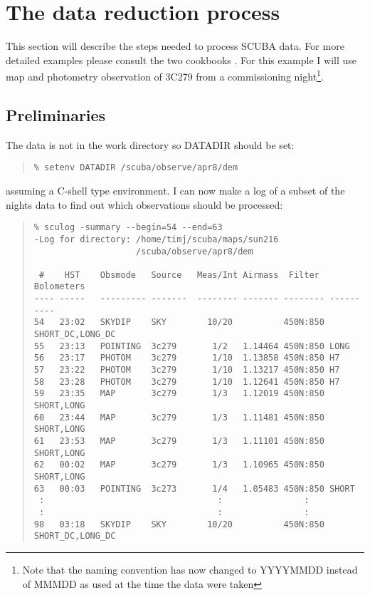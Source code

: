 \documentclass[twoside,11pt]{article}
\newenvironment{myquote}{\begin{quote}\begin{small}}{\end{small}\end{quote}}
\newcommand{\xlabel}[1]{}
\begin{document}
\section{\xlabel{reduction}The data reduction process\label{reduction}}

This section will describe the steps needed to process SCUBA data. For more
detailed examples please consult the two cookbooks \cite{S97,SANDELL97}.
For this example I will use map and photometry observation of 3C279
from a commissioning night\footnote{Note that the naming convention has now
changed to YYYYMMDD instead of MMMDD as used at the time the data were
taken}.

\subsection{Preliminaries}
\label{prelim}

The data is not in the work directory so DATADIR should be set:

\begin{myquote}
\begin{verbatim}
% setenv DATADIR /scuba/observe/apr8/dem
\end{verbatim}
\end{myquote}

assuming a C-shell type environment. I can now make a log of a subset
of the nights data to find out which observations should be processed:

\begin{myquote}
\begin{verbatim}
% sculog -summary --begin=54 --end=63
-Log for directory: /home/timj/scuba/maps/sun216
                    /scuba/observe/apr8/dem
 
 #    HST    Obsmode   Source   Meas/Int Airmass  Filter  Bolometers
---- -----   --------- -------  -------- ------- -------- ----------
54   23:02   SKYDIP    SKY        10/20          450N:850 SHORT_DC,LONG_DC
55   23:13   POINTING  3c279       1/2   1.14464 450N:850 LONG
56   23:17   PHOTOM    3c279       1/10  1.13858 450N:850 H7
57   23:22   PHOTOM    3c279       1/10  1.13217 450N:850 H7
58   23:28   PHOTOM    3c279       1/10  1.12641 450N:850 H7
59   23:35   MAP       3c279       1/3   1.12019 450N:850 SHORT,LONG
60   23:44   MAP       3c279       1/3   1.11481 450N:850 SHORT,LONG
61   23:53   MAP       3c279       1/3   1.11101 450N:850 SHORT,LONG
62   00:02   MAP       3c279       1/3   1.10965 450N:850 SHORT,LONG
63   00:03   POINTING  3c273       1/4   1.05483 450N:850 SHORT
 :                                  :                :
 :                                  :                :
98   03:18   SKYDIP    SKY        10/20          450N:850 SHORT_DC,LONG_DC
\end{verbatim}
\end{myquote}
\end{document}
